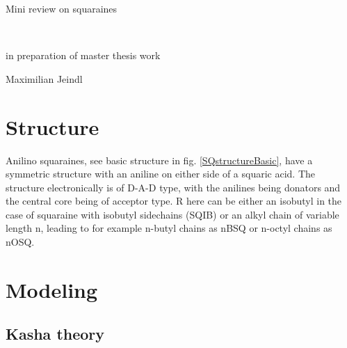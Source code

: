 \documentclass{article}
\begin{document}
\begin{center}
\begin{Large}

Mini review on squaraines
\end{Large}\\
\begin{large}
in preparation of master thesis work\\
\end{large}
\normalsize Maximilian Jeindl\\
\end{center}


\begin{multicols}{2}
\section{Structure}
Anilino squaraines, see basic structure in fig. \ref{SQstructureBasic}, have a symmetric structure with an aniline on either side of a squaric acid. The structure electronically is of D-A-D type, with the anilines being donators and the central core being of acceptor type. R here can be either an isobutyl in the case of squaraine with isobutyl sidechains (SQIB) or an alkyl chain of variable length n, leading to for example n-butyl chains as nBSQ or n-octyl chains as nOSQ. \cite{doi:10.1021/acs.jpcc.2c03665}

\section{Modeling}
\subsection{Kasha theory}


\end{multicols}
\end{document}
